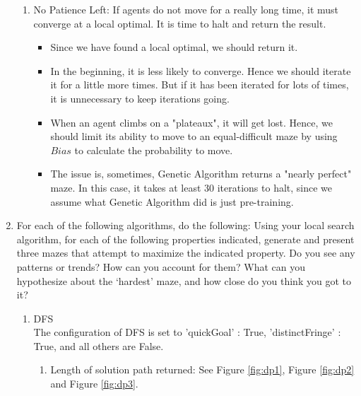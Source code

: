 \documentclass[letter]{article}
\begin{document}
\begin{enumerate}[resume]
\begin{enumerate}
			\item {No Patience Left: If agents do not move for a really long time, it must converge at a local optimal. It is time to halt and return the result.} 
			\begin{itemize}
				\item {Since we have found a local optimal, we should return it.}
				\item {In the beginning, it is less likely to converge. Hence we should iterate it for a little more times. But if it has been iterated for lots of times, it is unnecessary to keep iterations going.}
				\item {When an agent climbs on a "plateaux", it will get lost. Hence, we should limit its ability to move to an equal-difficult maze by using $Bias$ to calculate the probability to move.}
				\item {The issue is, sometimes, Genetic Algorithm returns a "nearly perfect" maze. In this case, it takes at least 30 iterations to halt, since we assume what Genetic Algorithm did is just pre-training.}
			\end{itemize}
		\end{enumerate}
		
		\item {For each of the following algorithms, do the following: Using your local search algorithm, for each of the following properties indicated, generate and present three mazes that attempt to maximize the indicated property. Do you see any patterns or trends? How can you account for them? What can you hypothesize about the ‘hardest’ maze, and how close do you think you got to it?}
		\begin{enumerate}
			\item {DFS} \\
			\label{DFS}
			The configuration of DFS is set to 'quickGoal' : True, 'distinctFringe' : True, and all others are False.
			\begin{enumerate}
				\item {Length of solution path returned: See Figure \ref{fig:dp1}, Figure \ref{fig:dp2} and Figure \ref{fig:dp3}.} \\
				\begin{figure}
					\minipage{\textwidth}
					

\end{figure}
\end{enumerate}
\end{enumerate}
\end{enumerate}
\end{document}
